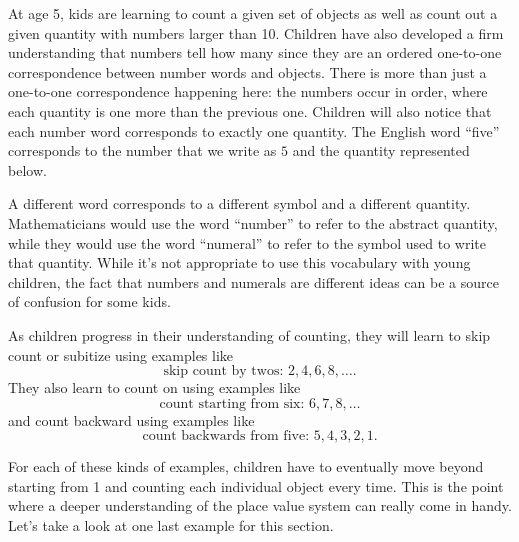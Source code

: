 \documentclass{ximera}
\begin{document}
At age 5, kids are learning to count a given set of objects as well as count out a given quantity with numbers larger than 10. Children have also developed a firm understanding that numbers tell how many since they are an ordered one-to-one correspondence between number words and objects. There is more than just a one-to-one correspondence happening here: the numbers  occur in order, where each quantity is one more than the previous one. Children will also notice that each number word corresponds to exactly one quantity. The English word ``five'' corresponds to the number that we write as $5$ and the quantity represented below.

\begin{image}
\end{image}

A different word corresponds to a different symbol and a different quantity. Mathematicians would use the word ``number'' to refer to the abstract quantity, while they would use the word ``numeral'' to refer to the symbol used to write that quantity. While it's not appropriate to use this vocabulary with young children, the fact that numbers and numerals are different ideas can be a source of confusion for some kids. 

As children progress in their understanding of counting, they will learn to skip count or subitize using examples like
\[
\textrm{skip count by twos: } 2, 4, 6, 8, \dots.
\] 
They also learn to count on using examples like
\[
\textrm{count starting from six: } 6, 7, 8, \dots
\]
and count backward using examples like
\[
\textrm{count backwards from five: } 5, 4, 3, 2, 1. 
\]

For each of these kinds of examples, children have to eventually move beyond starting from 1 and counting each individual object every time. This is the point where a deeper understanding of the place value system can really come in handy. Let's take a look at one last example for this section.
\end{document}
